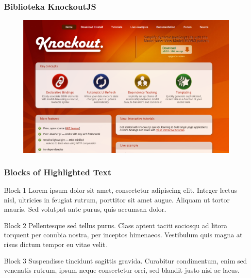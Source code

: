 \documentclass{beamer}
\begin{document}
\begin{frame}
	\frametitle{Biblioteka KnockoutJS}
	\begin{figure}
		\centering
		\includegraphics[width=\textwidth]{img/ko_page}
	\end{figure}
\end{frame}


\begin{frame}
\frametitle{Blocks of Highlighted Text}
\begin{block}{Block 1}
Lorem ipsum dolor sit amet, consectetur adipiscing elit. Integer lectus nisl, ultricies in feugiat rutrum, porttitor sit amet augue. Aliquam ut tortor mauris. Sed volutpat ante purus, quis accumsan dolor.
\end{block}

\begin{block}{Block 2}
Pellentesque sed tellus purus. Class aptent taciti sociosqu ad litora torquent per conubia nostra, per inceptos himenaeos. Vestibulum quis magna at risus dictum tempor eu vitae velit.
\end{block}

\begin{block}{Block 3}
Suspendisse tincidunt sagittis gravida. Curabitur condimentum, enim sed venenatis rutrum, ipsum neque consectetur orci, sed blandit justo nisi ac lacus.
\end{block}
\end{frame}

\end{document}
